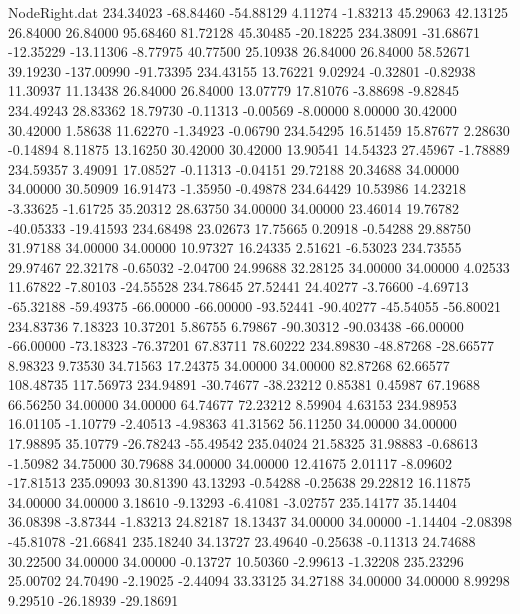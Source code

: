 \begin{filecontents}{NodeRight.dat}
 234.34023  -68.84460  -54.88129     4.11274   -1.83213   45.29063   42.13125   26.84000   26.84000   95.68460   81.72128   45.30485  -20.18225
 234.38091  -31.68671  -12.35229   -13.11306   -8.77975   40.77500   25.10938   26.84000   26.84000   58.52671   39.19230 -137.00990  -91.73395
 234.43155   13.76221    9.02924    -0.32801   -0.82938   11.30937   11.13438   26.84000   26.84000   13.07779   17.81076   -3.88698   -9.82845
 234.49243   28.83362   18.79730    -0.11313   -0.00569   -8.00000    8.00000   30.42000   30.42000    1.58638   11.62270   -1.34923   -0.06790
 234.54295   16.51459   15.87677     2.28630   -0.14894    8.11875   13.16250   30.42000   30.42000   13.90541   14.54323   27.45967   -1.78889
 234.59357    3.49091   17.08527    -0.11313   -0.04151   29.72188   20.34688   34.00000   34.00000   30.50909   16.91473   -1.35950   -0.49878
 234.64429   10.53986   14.23218    -3.33625   -1.61725   35.20312   28.63750   34.00000   34.00000   23.46014   19.76782  -40.05333  -19.41593
 234.68498   23.02673   17.75665     0.20918   -0.54288   29.88750   31.97188   34.00000   34.00000   10.97327   16.24335    2.51621   -6.53023
 234.73555   29.97467   22.32178    -0.65032   -2.04700   24.99688   32.28125   34.00000   34.00000    4.02533   11.67822   -7.80103  -24.55528
 234.78645   27.52441   24.40277    -3.76600   -4.69713  -65.32188  -59.49375  -66.00000  -66.00000  -93.52441  -90.40277  -45.54055  -56.80021
 234.83736    7.18323   10.37201     5.86755    6.79867  -90.30312  -90.03438  -66.00000  -66.00000  -73.18323  -76.37201   67.83711   78.60222
 234.89830  -48.87268  -28.66577     8.98323    9.73530   34.71563   17.24375   34.00000   34.00000   82.87268   62.66577  108.48735  117.56973
 234.94891  -30.74677  -38.23212     0.85381    0.45987   67.19688   66.56250   34.00000   34.00000   64.74677   72.23212    8.59904    4.63153
 234.98953   16.01105   -1.10779    -2.40513   -4.98363   41.31562   56.11250   34.00000   34.00000   17.98895   35.10779  -26.78243  -55.49542
 235.04024   21.58325   31.98883    -0.68613   -1.50982   34.75000   30.79688   34.00000   34.00000   12.41675    2.01117   -8.09602  -17.81513
 235.09093   30.81390   43.13293    -0.54288   -0.25638   29.22812   16.11875   34.00000   34.00000    3.18610   -9.13293   -6.41081   -3.02757
 235.14177   35.14404   36.08398    -3.87344   -1.83213   24.82187   18.13437   34.00000   34.00000   -1.14404   -2.08398  -45.81078  -21.66841
 235.18240   34.13727   23.49640    -0.25638   -0.11313   24.74688   30.22500   34.00000   34.00000   -0.13727   10.50360   -2.99613   -1.32208
 235.23296   25.00702   24.70490    -2.19025   -2.44094   33.33125   34.27188   34.00000   34.00000    8.99298    9.29510  -26.18939  -29.18691

\end{filecontents}
